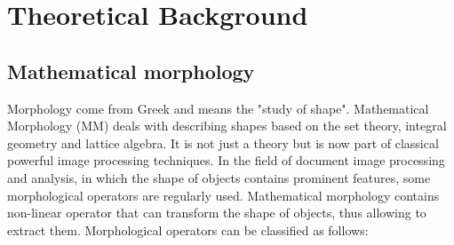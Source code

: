 
\graphicspath{ {3chapterTheory/image/} }
\chapter{Theoretical Background}
\section{Mathematical morphology}
Morphology come from Greek and means the "study of shape". Mathematical Morphology (MM) deals with describing shapes based on the set theory, integral geometry and lattice algebra. It is not just a theory but is now part of classical powerful image processing techniques. In the field of document image processing and analysis, in which the shape of objects contains prominent features, some morphological operators are regularly used. Mathematical morphology contains non-linear operator that can transform the shape of objects, thus allowing to extract them. Morphological operators can be classified as follows:
